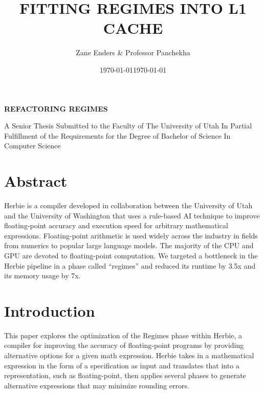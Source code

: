 \documentclass{article}
\title{\uppercase{Fitting Regimes into L1 cache}}
\author{Zane Enders & Professor Panchekha}
\date{\today}
\begin{document}
\begin{titlepage}
    \begin{center}
    

       \vspace*{1cm}

        \textbf{\uppercase{Refactoring Regimes}}

       \vspace{0.5cm}
       
       
       \date{\today}
            
       \vspace{1.5cm}

   
        A Senior Thesis Submitted to the Faculty of 
        The University of Utah
        In Partial Fulfillment of the Requirements for the
        Degree of Bachelor of Science
        In
        Computer Science
            
       \vspace{0.8cm}
            
       \vfill
    \end{center}
\end{titlepage}
\newpage


\section{Abstract}
Herbie \cite{Herbie} is a compiler developed in collaboration between the University of Utah and the University of Washington that uses a rule-based AI technique to improve floating-point accuracy and execution speed for arbitrary mathematical expressions. Floating-point arithmetic is used widely across the industry in fields from numerics to popular large language models. The majority of the CPU and GPU are devoted to floating-point computation. We targeted a bottleneck in the Herbie pipeline in a phase called “regimes” and reduced its runtime by 3.5x and its memory usage by 7x.

\section{Introduction}
This paper explores the optimization of the Regimes phase within Herbie, a compiler for improving the accuracy of floating-point programs by providing alternative options for a given math expression. Herbie takes in a mathematical expression in the form of a specification as input and translates that into a representation, such as floating-point, then applies several phases to generate alternative expressions that may minimize rounding errors.
\end{document}
